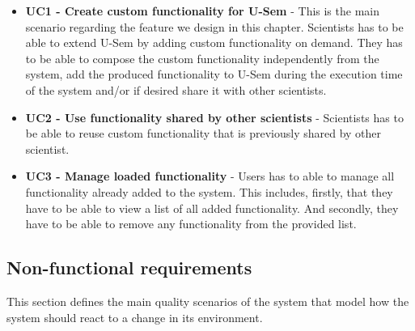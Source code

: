 \begin{itemize}

	\item \textbf{UC1 - Create custom functionality for U-Sem} - This is the main scenario regarding the feature we design in this chapter. Scientists has to be able to extend U-Sem by adding custom functionality on demand. They has to be able to compose the custom functionality independently from the system, add the produced functionality to U-Sem during the execution time of the system and/or if desired share it with other scientists.
	
	\item \textbf{UC2 - Use functionality shared by other scientists} - Scientists has to be able to reuse custom functionality that is previously shared by other scientist.
	
	\item \textbf{UC3 - Manage loaded functionality} - Users has to able to manage all functionality already added to the system. This includes, firstly, that they have to be able to view a list of all added functionality. And secondly, they have to be able to remove any functionality from the provided list.
			
\end{itemize}

\subsection{Non-functional requirements}

This section defines the main quality scenarios of the system that model how the system should react to a change in its environment.

